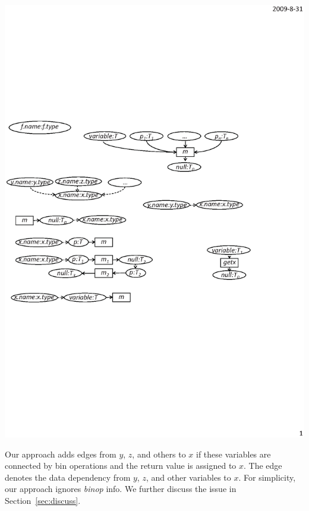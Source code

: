 \begin{center}
\includegraphics[scale=0.7,clip]{figure/rule9.eps}%
\end{center}

Our approach adds edges from $y$, $z$, and others to $x$ if these
variables are connected by bin operations and the return value is
assigned to $x$. The edge denotes the data dependency from $y$, $z$,
and other variables to $x$. For simplicity, our approach ignores
\emph{binop} info. We further discuss the issue in
Section~\ref{sec:discuss}.

